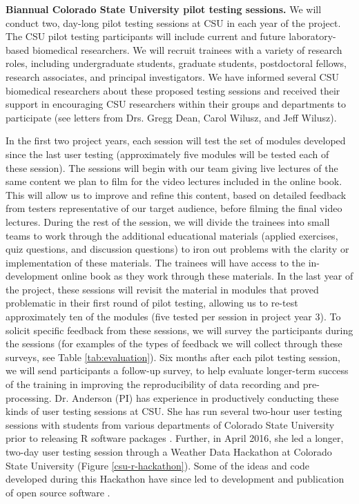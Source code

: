 \documentclass[pdftex,english,11pt,parskip=half]{scrartcl}
\begin{document}


\textbf{Biannual Colorado State University pilot testing sessions.}
We will conduct two, day-long pilot testing sessions at CSU in each year of the
project. The CSU pilot testing participants will include current and future
laboratory-based biomedical researchers. We will recruit trainees with a variety
of research roles, including undergraduate students, graduate students,
postdoctoral fellows, research associates, and principal investigators. We have
informed several CSU biomedical researchers about these proposed testing
sessions and received their support in encouraging CSU researchers within their
groups and departments to participate (see letters from Drs. Gregg Dean, Carol Wilusz, and Jeff Wilusz). 

In the first two project years, each session will test the set of modules
developed since the last user testing (approximately five modules will be tested
each of these session). The sessions will begin with our team giving live
lectures of the same content we plan to film for the video lectures included in
the online book. This will allow us to improve and refine this content, based on
detailed feedback from testers representative of our target audience, before
filming the final video lectures. During the rest of the session, we will divide
the trainees into small teams to work through the additional educational
materials (applied exercises, quiz questions, and discussion questions) to iron
out problems with the clarity or implementation of these materials. The trainees
will have access to the in-development online book as they work through these
materials. In the last year of the project, these sessions will revisit the material
in modules that proved problematic in their first round of pilot testing, allowing us
to re-test approximately ten of the modules (five tested per session in project year 3).
To solicit specific feedback from these sessions, we will survey the participants during the sessions (for examples of the types of feedback we will collect through these surveys, see Table \ref{tab:evaluation}). Six months after each pilot testing session, we will send participants a follow-up survey, to help evaluate longer-term success of the training in improving the reproducibility of data recording and pre-processing. Dr. Anderson (PI) has experience in productively conducting these kinds of user
testing sessions at CSU. She has run several two-hour user testing sessions with
students from various departments of Colorado State University prior to
releasing R software packages \cite{futureheatwaves, countyweather}. Further, in
April 2016, she led a longer, two-day user testing session through a Weather
Data Hackathon at Colorado State University (Figure \ref{csu-r-hackathon}).
Some of the ideas and code developed during this Hackathon have
since led to development and publication of open source software
\cite{countyfloods, noaastormevents}.
\end{document}
